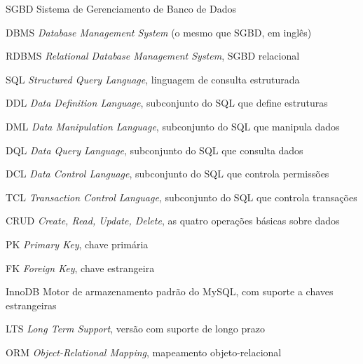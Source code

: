 \documentclass[12pt, a4paper, openright, oneside, brazil]{abntex2}
\begin{document}

\imprimircapa
\imprimirfolhaderosto

\newpage
\listoftables

\begin{siglas}
  \item[SGBD] Sistema de Gerenciamento de Banco de Dados
  \item[DBMS] \emph{Database Management System} (o mesmo que SGBD, em inglês)
  \item[RDBMS] \emph{Relational Database Management System}, SGBD relacional
  \item[SQL] \emph{Structured Query Language}, linguagem de consulta estruturada
  \item[DDL] \emph{Data Definition Language}, subconjunto do SQL que define estruturas
  \item[DML] \emph{Data Manipulation Language}, subconjunto do SQL que manipula dados
  \item[DQL] \emph{Data Query Language}, subconjunto do SQL que consulta dados
  \item[DCL] \emph{Data Control Language}, subconjunto do SQL que controla permissões
  \item[TCL] \emph{Transaction Control Language}, subconjunto do SQL que controla transações
  \item[CRUD] \emph{Create, Read, Update, Delete}, as quatro operações básicas sobre dados
  \item[PK] \emph{Primary Key}, chave primária
  \item[FK] \emph{Foreign Key}, chave estrangeira
  \item[InnoDB] Motor de armazenamento padrão do MySQL, com suporte a chaves estrangeiras
  \item[LTS] \emph{Long Term Support}, versão com suporte de longo prazo
  \item[ORM] \emph{Object-Relational Mapping}, mapeamento objeto-relacional
\end{siglas}

\tableofcontents






\end{document}

